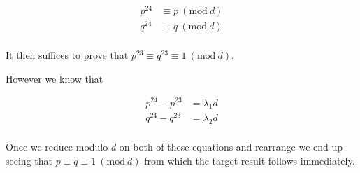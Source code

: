 \documentclass[11pt]{article}
\begin{document}
\begin{align*}
p^{24} &\equiv p \ (\text{mod} \ d) \\
q^{24} &\equiv q \ (\text{mod} \ d) \\
\end{align*}

\noindent
It then suffices to prove that $p^{23} \equiv q^{23} \equiv 1 \ (\text{mod} \ d)$.

\noindent
However we know that

\begin{align*}
p^{24} - p^{23} &= \lambda_1 d \\
q^{24} - q^{23} &= \lambda_2 d \\
\end{align*}

\noindent
Once we reduce modulo $d$ on both of these equations and rearrange we end up seeing that $p \equiv q \equiv 1 \ (\text{mod} \ d)$ from which the target result follows immediately.
\end{document}
